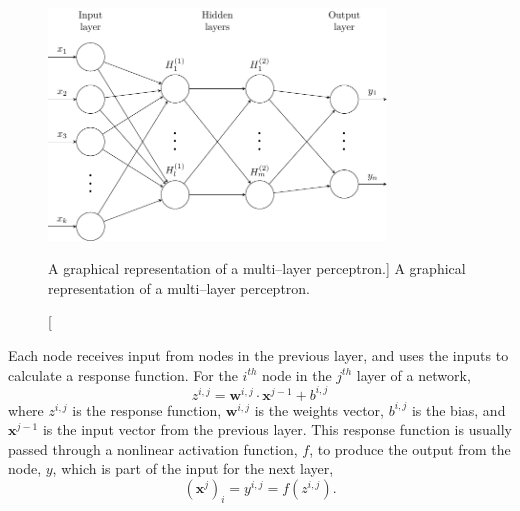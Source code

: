 \begin{figure}

	\centering

	\includegraphics[width = 0.8\textwidth]{figures/mlp.pdf}

	\caption
	[A graphical representation of a multi--layer perceptron.]
	{ A graphical representation of a multi--layer perceptron. }

	\label{fig:mlp}

\end{figure}

Each node receives input from nodes in the previous layer, and uses the inputs
to calculate a response function. For the $i^{th}$ node in the $j^{th}$ layer 
of a network, 
\begin{equation*}
	z^{i,j} = \mathbf{w}^{i,j} \cdot \mathbf{x}^{j-1} + b^{i,j}
\end{equation*}
where $z^{i,j}$ is the response function, $\mathbf{w}^{i,j}$ is the weights
vector, $b^{i,j}$ is the bias, and $\mathbf{x}^{j-1}$ is the input vector from 
the previous layer. This response function is usually passed through a
nonlinear activation function, $f$, to produce the output from the node,
$y$, which is part of the input for the next layer,
\begin{equation*}
	\left(\mathbf{x}^j\right)_i = y^{i,j} = f \left( z^{i,j} \right).
\end{equation*}

